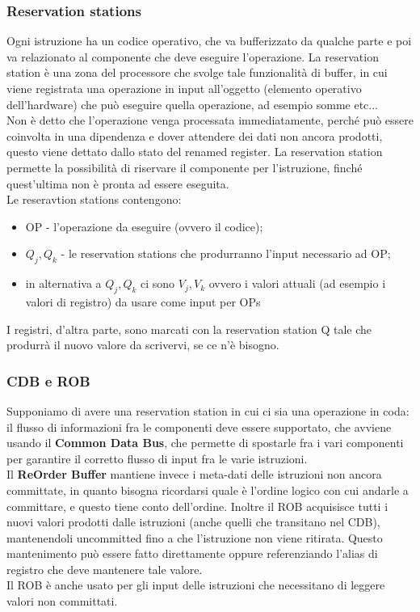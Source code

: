 \documentclass[14pt, oneside]{book}
\begin{document}
\subsubsection{Reservation stations}
Ogni istruzione ha un codice operativo, che va bufferizzato da qualche parte e poi va relazionato al componente che deve eseguire l'operazione. La reservation station è una zona del processore che svolge tale funzionalità di buffer, in cui viene registrata una operazione in input all'oggetto (elemento operativo dell'hardware) che può eseguire quella operazione, ad esempio somme etc...\\  Non è detto che l'operazione venga processata immediatamente, perché può essere coinvolta in una dipendenza e dover attendere dei dati non ancora prodotti, questo viene dettato dallo stato del renamed register. La reservation station permette la possibilità di riservare il componente per l'istruzione, finché quest'ultima non è pronta ad essere eseguita.\\ Le reseravtion stations contengono:
\begin{itemize}
\item OP - l'operazione da eseguire (ovvero il codice);
\item $Q_j, Q_k$ - le reservation stations che produrranno l'input necessario ad OP;
\item in alternativa a $Q_j, Q_k$ ci sono $V_j, V_k$ ovvero i valori attuali (ad esempio i valori di registro) da usare come input per OPs
\end{itemize}
I registri, d'altra parte, sono marcati con la reservation station Q tale che produrrà il nuovo valore da scrivervi, se ce n'è bisogno.
\subsubsection{CDB e ROB}
Supponiamo di avere una reservation station in cui ci sia una operazione in coda: il flusso di informazioni fra le componenti deve essere supportato, che avviene usando il \textbf{Common Data Bus}, che permette di spostarle fra i vari componenti per garantire il corretto flusso di input fra le varie istruzioni.\\ Il \textbf{ReOrder Buffer} mantiene invece i meta-dati delle istruzioni non ancora committate, in quanto bisogna ricordarsi quale è l'ordine logico con cui andarle a committare, e questo tiene conto dell'ordine. Inoltre il ROB acquisisce tutti i nuovi valori prodotti dalle istruzioni (anche quelli che transitano nel CDB), mantenendoli uncommitted fino a che l'istruzione non viene ritirata. Questo mantenimento può essere fatto direttamente oppure referenziando l'alias di registro che deve mantenere tale valore.\\ Il ROB è anche usato per gli input delle istruzioni che necessitano di leggere valori non committati.
\end{document}
